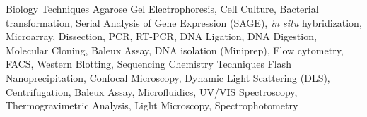 
\begin{cvskills}
  \cvskill
    {Biology Techniques}
    {Agarose Gel Electrophoresis, Cell Culture, Bacterial transformation, Serial Analysis of Gene Expression (SAGE), \emph{in situ} hybridization, Microarray, Dissection, PCR, RT-PCR, DNA Ligation, DNA Digestion, Molecular Cloning, Baleux Assay, DNA isolation (Miniprep), Flow cytometry, FACS, Western Blotting, Sequencing}
  \cvskill
    {Chemistry Techniques}
    {Flash Nanoprecipitation, Confocal Microscopy, Dynamic Light Scattering (DLS), Centrifugation, Baleux Assay, Microfluidics, UV/VIS Spectroscopy, Thermogravimetric Analysis, Light Microscopy, Spectrophotometry}
\end{cvskills}
